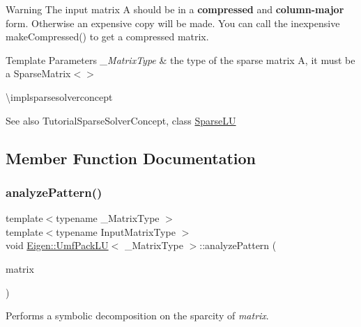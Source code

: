 \begin{DoxyWarning}{Warning}
The input matrix A should be in a {\bfseries{compressed}} and {\bfseries{column-\/major}} form. Otherwise an expensive copy will be made. You can call the inexpensive make\+Compressed() to get a compressed matrix. 
\end{DoxyWarning}

\begin{DoxyTemplParams}{Template Parameters}
{\em \+\_\+\+Matrix\+Type} & the type of the sparse matrix A, it must be a Sparse\+Matrix$<$$>$\\
\hline
\end{DoxyTemplParams}
\textbackslash{}implsparsesolverconcept

\begin{DoxySeeAlso}{See also}
Tutorial\+Sparse\+Solver\+Concept, class \mbox{\hyperlink{class_eigen_1_1_sparse_l_u}{Sparse\+LU}} 
\end{DoxySeeAlso}


\subsection{Member Function Documentation}
\mbox{\label{class_eigen_1_1_umf_pack_l_u_ac7ea28b2017d6b26b7b08497f294e5e6}} 
\subsubsection{\texorpdfstring{analyzePattern()}{analyzePattern()}}
{\footnotesize\ttfamily template$<$typename \+\_\+\+Matrix\+Type $>$ \\
template$<$typename Input\+Matrix\+Type $>$ \\
void \mbox{\hyperlink{class_eigen_1_1_umf_pack_l_u}{Eigen\+::\+Umf\+Pack\+LU}}$<$ \+\_\+\+Matrix\+Type $>$\+::analyze\+Pattern (\begin{DoxyParamCaption}\item[{const Input\+Matrix\+Type \&}]{matrix }\end{DoxyParamCaption})\hspace{0.3cm}{\ttfamily [inline]}}

Performs a symbolic decomposition on the sparcity of {\itshape matrix}.

